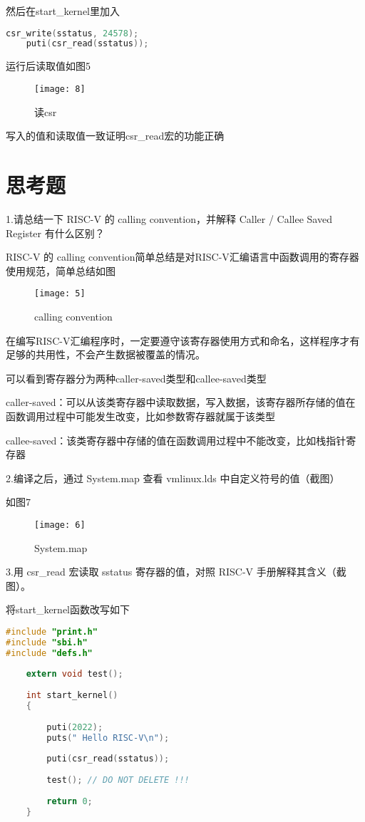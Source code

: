 \documentclass{source/Report}
\begin{document}
然后在start\_kernel里加入

\begin{lstlisting}[language = c, title = {验证}]
    csr_write(sstatus, 24578);
    puti(csr_read(sstatus));
\end{lstlisting}

运行后读取值如图5

\begin{figure}[p]
    \centering
    \texttt{[image: 8]}
    \caption{读csr}
\end{figure}

写入的值和读取值一致证明csr\_read宏的功能正确

\section{思考题}

1.请总结一下 RISC-V 的 calling convention，并解释 Caller / Callee Saved Register 有什么区别？

RISC-V 的 calling convention简单总结是对RISC-V汇编语言中函数调用的寄存器使用规范，简单总结如图

\begin{figure}[p]
    \centering
    \texttt{[image: 5]}
    \caption{calling convention}
\end{figure}

在编写RISC-V汇编程序时，一定要遵守该寄存器使用方式和命名，这样程序才有足够的共用性，不会产生数据被覆盖的情况。

可以看到寄存器分为两种caller-saved类型和callee-saved类型

caller-saved：可以从该类寄存器中读取数据，写入数据，该寄存器所存储的值在函数调用过程中可能发生改变，比如参数寄存器就属于该类型

callee-saved：该类寄存器中存储的值在函数调用过程中不能改变，比如栈指针寄存器

2.编译之后，通过 System.map 查看 vmlinux.lds 中自定义符号的值（截图）

如图7

\begin{figure}[p]
    \centering
    \texttt{[image: 6]}
    \caption{System.map}
\end{figure}

3.用 csr\_read 宏读取 sstatus 寄存器的值，对照 RISC-V 手册解释其含义（截图）。

将start\_kernel函数改写如下

\begin{lstlisting}[language = c, title = {验证}]
#include "print.h"
#include "sbi.h"
#include "defs.h"
    
    extern void test();
    
    int start_kernel()
    {
    
        puti(2022);
        puts(" Hello RISC-V\n");
    
        puti(csr_read(sstatus));
    
        test(); // DO NOT DELETE !!!
    
        return 0;
    }
\end{lstlisting}
\end{document}
